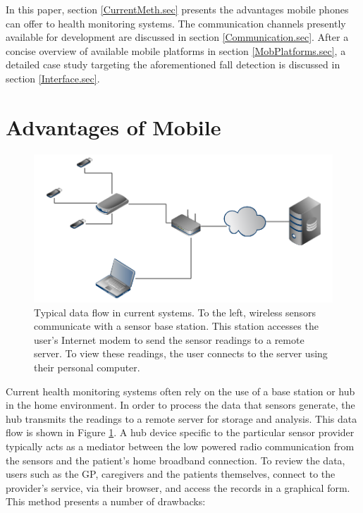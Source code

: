 \documentclass[conference,a4paper]{IEEEtran}
\begin{document}
In this paper, section \ref{CurrentMeth.sec} presents the advantages mobile phones can offer to health monitoring systems. The communication channels presently available for development are discussed in section \ref{Communication.sec}. After a concise overview of available mobile platforms in section \ref{MobPlatforms.sec}, a detailed case study targeting the aforementioned fall detection is discussed in section \ref{Interface.sec}. 


\section{Advantages of Mobile\label{CurrentMeth.sec}}

\begin{figure}[t]
\centering
\includegraphics[scale=0.27]{./figures/currentFlow.png}
\caption{Typical data flow in current systems. To the left, wireless sensors communicate with a sensor base station. This station accesses the user's Internet modem to send the sensor readings to a remote server. To view these readings, the user connects to the server using their personal computer.}
\label{figCurFlow}
\end{figure}

Current health monitoring systems often rely on the use of a base station or hub in the home environment. In order to process the data that sensors generate, the hub transmits the readings to a remote server for storage and analysis.
This data flow is shown in Figure \ref{figCurFlow}.
A hub device specific to the particular sensor provider typically acts as a mediator between the low powered radio communication from the sensors and the patient's home broadband connection.
To review the data, users such as the GP, caregivers and the patients themselves, connect to the provider's service, via their browser, and access the records in a graphical form. This method presents a number of drawbacks:
\end{document}
